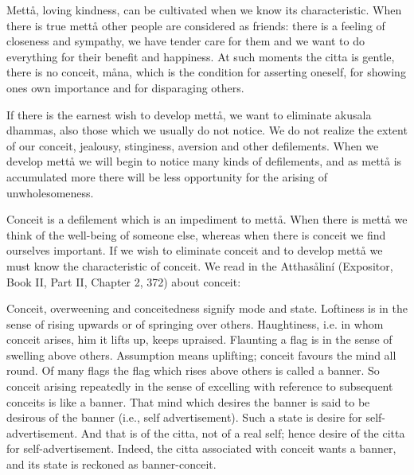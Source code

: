 \documentclass[12pt,twoside]{article}
\begin{document}
\bigskip


\bigskip

Mett{\aa}, loving kindness, can be cultivated when we know its
characteristic. When there is true mett{\aa} other people are
considered as friends: there is a feeling of closeness and sympathy, we
have tender care for them and we want to do everything for their
benefit and happiness. At such moments the citta is gentle, there is no
conceit, m{\aa}na, which is the condition for asserting oneself, for
showing one{\textquotesingle}s own importance and for disparaging
others. 

If there is the earnest wish to develop mett{\aa}, we want to eliminate
akusala dhammas, also those which we usually do not notice. We do not
realize the extent of our conceit, jealousy, stinginess, aversion and
other defilements. When we develop mett{\aa} we will begin to notice
many kinds of defilements, and as mett{\aa} is accumulated more there
will be less opportunity for the arising of unwholesomeness. 

Conceit is a defilement which is an impediment to mett{\aa}. When there
is mett{\aa} we think of the well{}-being of someone else, whereas when
there is conceit we find ourselves important. If we wish to eliminate
conceit and to develop mett{\aa} we must know the characteristic of
conceit. We read in the Atthas{\aa}lin\'i (Expositor, Book II, Part II,
Chapter 2, 372) about conceit:


\bigskip

{\textasciigrave}{\textasciigrave}Conceit{\textquotesingle}{\textquotesingle},
{\textasciigrave}{\textasciigrave}overweening{\textquotesingle}{\textquotesingle}
and
{\textasciigrave}{\textasciigrave}conceitedness{\textquotesingle}{\textquotesingle}
signify mode and state.
{\textasciigrave}{\textasciigrave}Loftiness{\textquotesingle}{\textquotesingle}
is in the sense of rising upwards or of springing over others.
{\textasciigrave}{\textasciigrave}Haughtiness{\textquotesingle}{\textquotesingle},
i.e. in whom conceit arises, him it lifts up, keeps upraised.
{\textasciigrave}{\textasciigrave}Flaunting a
flag{\textquotesingle}{\textquotesingle} is in the sense of swelling
above others.
{\textasciigrave}{\textasciigrave}Assumption{\textquotesingle}{\textquotesingle}
means uplifting; conceit favours the mind all round. Of many flags the
flag which rises above others is called a banner. So conceit arising
repeatedly in the sense of excelling with reference to subsequent
conceits is like a banner. That mind which desires the banner is said
to be desirous of the banner (i.e., self advertisement). Such a state
is desire for self{}-advertisement. And that is of the citta, not of a
real self; hence {\textasciigrave}{\textasciigrave}desire of the citta
for self{}-advertisement{\textquotesingle}{\textquotesingle}. Indeed,
the citta associated with conceit wants a banner, and its state is
reckoned as banner{}-conceit. 
\end{document}
